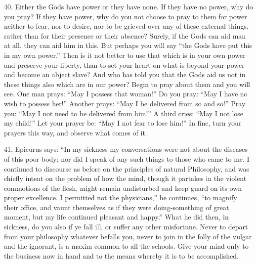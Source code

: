 \documentclass{book}
\begin{document}
40. Either the Gods have power or they have none. If they have no
power, why do you pray? If they have power, why do you not choose to
pray to them for power neither to fear, nor to desire, nor to be
grieved over any of these external things, rather than for their
presence or their absence? Surely, if the Gods can aid man at all,
they can aid him in this. But perhaps you will say ``the Gods have put
this in my own power.'' Then is it not better to use that which is in
your own power and preserve your liberty, than to set your heart on
what is beyond your power and become an abject slave? And who has told
you that the Gods aid us not in these things also which are in our
power? Begin to pray about them and you will see. One man prays: ``May
I possess that woman!'' Do you pray: ``May I have no wish to possess
her!'' Another prays: ``May I be delivered from so and so!'' Pray you:
``May I not need to be delivered from him!'' A third cries: ``May I not
lose my child!''  Let your prayer be: ``May I not fear to lose him!'' In
fine, turn your prayers this way, and observe what comes of it.

41. Epicurus says: ``In my sickness my conversations were not about the
diseases of this poor body; nor did I speak of any such things to
those who came to me. I continued to discourse as before on the
principles of natural Philosophy, and was chiefly intent on the
problem of how the mind, though it partakes in the violent commotions
of the flesh, might remain undisturbed and keep guard on its own
proper excellence. I permitted not the physicians,'' he continues, ``to
magnify their office, and vaunt themselves as if they were
doing-something of great moment, but my life continued pleasant and
happy.'' What he did then, in sickness, do you also if ye fall ill, or
suffer any other misfortune. Never to depart from your philosophy
whatever befalls you, never to join in the folly of the vulgar and the
ignorant, is a maxim common to all the schools. Give your mind only to
the business now in hand and to the means whereby it is to be
accomplished.
\end{document}
